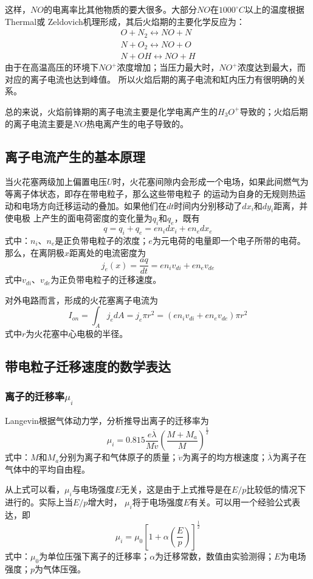 这样，$NO$的电离率比其他物质的要大很多。大部分$NO$在$1000^{\circ}C$以上的温度根据Thermal或
Zeldovich\cite{zeldovich1946oxidation}机理形成，其后火焰期的主要化学反应为：
\begin{align}
O+N_{2}\longleftrightarrow NO+N\\
N+O_{2}\longleftrightarrow NO+O\\
N+OH\longleftrightarrow NO+H
\end{align}
由于在高温高压的环境下$NO^{+}$浓度增加；当压力最大时，$NO^{+}$浓度达到最大，而对应的离子电流也达到峰值。
所以火焰后期的离子电流和缸内压力有很明确的关系。\par
总的来说，火焰前锋期的离子电流主要是化学电离产生的$H_{3}O^{+}$导致的；火焰后期的离子电流主要是$NO$热电离产生的电子导致的。
\subsection{离子电流产生的基本原理}
当火花塞两级加上偏置电压$U$时，火花塞间隙内会形成一个电场，如果此间燃气为等离子体状态，即存在带电粒子，那么这些带电粒子
的运动为自身的无规则热运动和电场方向迁移运动的叠加。如果他们在$dt$时间内分别移动了$dx_{i}$和$dy_{i}$距离，并使电极
上产生的面电荷密度的变化量为$q_{i}$和$q_{e}$，既有
\begin{equation}
q=q_{i}+q_{e}=en_{i}dx_{i}+en_{e}dx_{e}
\end{equation}
式中：$n_{i}$、$n_{e}$是正负带电粒子的浓度；$e$为元电荷的电量即一个电子所带的电荷。那么，在离阴极$x$距离处的电流密度为
\begin{equation}
j_{e}(x)=\frac{aq}{dt}=en_{i}v_{di}+en_{e}v_{de}
\end{equation}
式中$v_{di}$、$v_{de}$为正负带电粒子的迁移速度。\par
对外电路而言，形成的火花塞离子电流为
\begin{equation}
I_{on}=\int_{A} j_{e}dA=j_{e}\pi r^{2}=(en_{i}v_{di}+en_{e}v_{de})\pi r^{2}
\end{equation}
式中$r$为火花塞中心电极的半径。
\subsection{带电粒子迁移速度的数学表达}
\subsubsection*{离子的迁移率$\mu_{i}$}
Langevin根据气体动力学，分析推导出离子的迁移率为
\begin{equation}
\mu_{i}=0.815\frac{e\overline{\lambda}}{M\ddot{v}}(\frac{M+M_{a}}{M})^{\frac{1}{2}}
\end{equation}
式中：$M$和$M_{a}$分别为离子和气体原子的质量；$\ddot{v}$为离子的均方根速度；$\overline{\lambda}$为离子在气体中的平均自由程。\par
从上式可以看，$\mu_{i}$与电场强度$E$无关，这是由于上式推导是在$E/p$比较低的情况下进行的。实际上当$E/p$增大时，
$\mu_{i}$将于电场强度$E$有关。可以用一个经验公式表达，即
\begin{equation}
\mu_{i}=\mu_{0}[1+\alpha(\frac{E}{p})]^{\frac{1}{2}}
\end{equation}
式中：$\mu_{0}$为单位压强下离子的迁移率；$\alpha$为迁移常数，数值由实验测得；$E$为电场强度；$p$为气体压强。
